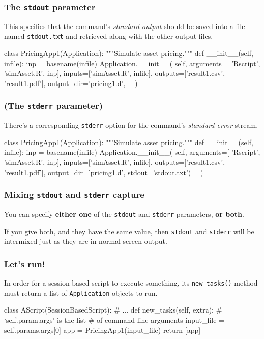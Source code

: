 \documentclass[english,serif,mathserif,xcolor=pdftex,dvipsnames,table]{beamer}
\begin{document}
\begin{frame}[fragile]
\frametitle{The \texttt{stdout} parameter}

This specifies that the command's \emph{standard output} should be
saved into a file named \texttt{stdout.txt} and retrieved along with
the other output files.

  \+
\begin{python}
class PricingApp1(Application):
  """Simulate asset pricing."""
  def __init__(self, infile):
    inp = basename(infile)
    Application.__init__(
      self,
      arguments=[
        'Rscript', 'simAsset.R', inp],
      inputs=['simAsset.R', infile],
      outputs=['result1.csv', 'result1.pdf'],
      output_dir='pricing1.d',
      ~~)
\end{python}
\end{frame}


\begin{frame}[fragile]
\frametitle{(The \texttt{stderr} parameter)}

There's a corresponding \texttt{stderr} option for the command's
\emph{standard error} stream.

\begin{python}
class PricingApp1(Application):
  """Simulate asset pricing."""
  def __init__(self, infile):
    inp = basename(infile)
    Application.__init__(
      self,
      arguments=[
        'Rscript', 'simAsset.R', inp],
      inputs=['simAsset.R', infile],
      outputs=['result1.csv', 'result1.pdf'],
      output_dir='pricing1.d',
      stdout='stdout.txt')
      ~~)
\end{python}
\end{frame}


\begin{frame}
  \frametitle{Mixing \texttt{stdout} and \texttt{stderr} capture}

  You can specify \textbf{either one} of the \texttt{stdout} and
  \texttt{stderr} parameters, \textbf{or both}.

  \+
  If you give both, and they have the same value, then
  \texttt{stdout} and \texttt{stderr} will be intermixed just as they
  are in normal screen output.
\end{frame}


\begin{frame}[fragile]
  \frametitle{Let's run!}
  In order for a session-based script to execute something, its
  \texttt{new\_tasks()} method must return a list of
  \texttt{Application} objects to run.

\+
\begin{python}
class AScript(SessionBasedScript):
  # ...
  def new_tasks(self, extra):
    # `self.param.args' is the list
    # of command-line arguments
    input_file = self.params.args[0]
    app = PricingApp1(input_file)
    return [app]
\end{python}
\end{frame}
\end{document}

